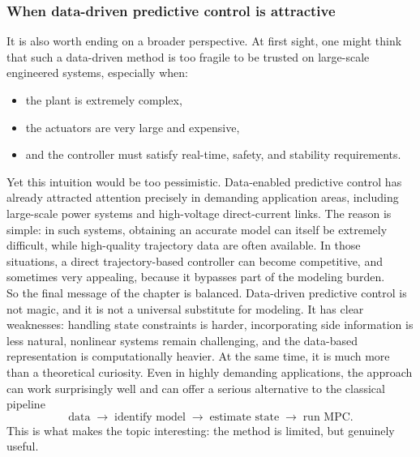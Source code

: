 \subsubsection{When data-driven predictive control is attractive}
It is also worth ending on a broader perspective. At first sight, one might think that such a data-driven method is too fragile to be trusted on large-scale engineered systems, especially when:
\begin{itemize}
    \item the plant is extremely complex,
    \item the actuators are very large and expensive,
    \item and the controller must satisfy real-time, safety, and stability requirements.
\end{itemize}
Yet this intuition would be too pessimistic. Data-enabled predictive control has already attracted attention precisely in demanding application areas, including large-scale power systems and high-voltage direct-current links. The reason is simple: in such systems, obtaining an accurate model can itself be extremely difficult, while high-quality trajectory data are often available. In those situations, a direct trajectory-based controller can become competitive, and sometimes very appealing, because it bypasses part of the modeling burden.\\
So the final message of the chapter is balanced. Data-driven predictive control is not magic, and it is not a universal substitute for modeling. It has clear weaknesses: handling state constraints is harder, incorporating side information is less natural, nonlinear systems remain challenging, and the data-based representation is computationally heavier. At the same time, it is much more than a theoretical curiosity. Even in highly demanding applications, the approach can work surprisingly well and can offer a serious alternative to the classical pipeline
\[
\text{data} \;\to\; \text{identify model} \;\to\; \text{estimate state} \;\to\; \text{run MPC}.
\]
This is what makes the topic interesting: the method is limited, but genuinely useful.
